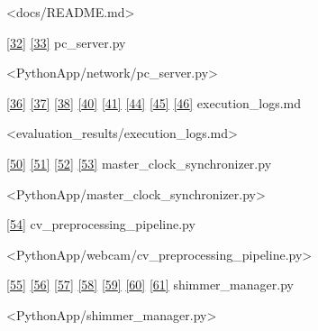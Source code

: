 \documentclass[12pt,a4paper]{article}
\begin{document}
\textless docs/README.md\textgreater{}

\href{PythonApp/network/pc_server.py\#L44-L53}{{[}32{]}} \href{PythonApp/network/pc_server.py\#L90-L98}{{[}33{]}} pc\_server.py

\textless PythonApp/network/pc\_server.py\textgreater{}

\href{evaluation_results/execution_logs.md\#L16-L24}{{[}36{]}} \href{evaluation_results/execution_logs.md\#L38-L46}{{[}37{]}} \href{evaluation_results/execution_logs.md\#L104-L113}{{[}38{]}} \href{evaluation_results/execution_logs.md\#L40-L48}{{[}40{]}} \href{evaluation_results/execution_logs.md\#L50-L58}{{[}41{]}} \href{evaluation_results/execution_logs.md\#L62-L70}{{[}44{]}} \href{evaluation_results/execution_logs.md\#L72-L75}{{[}45{]}} \href{evaluation_results/execution_logs.md\#L140-L146}{{[}46{]}} execution\_logs.md

\textless evaluation\_results/execution\_logs.md\textgreater{}

\href{PythonApp/master_clock_synchronizer.py\#L86-L94}{{[}50{]}} \href{PythonApp/master_clock_synchronizer.py\#L95-L102}{{[}51{]}} \href{PythonApp/master_clock_synchronizer.py\#L86-L102}{{[}52{]}} \href{PythonApp/master_clock_synchronizer.py\#L164-L172}{{[}53{]}} master\_clock\_synchronizer.py

\textless PythonApp/master\_clock\_synchronizer.py\textgreater{}

\href{PythonApp/webcam/cv_preprocessing_pipeline.py\#L72-L80}{{[}54{]}} cv\_preprocessing\_pipeline.py

\textless PythonApp/webcam/cv\_preprocessing\_pipeline.py\textgreater{}

\href{PythonApp/shimmer_manager.py\#L241-L249}{{[}55{]}} \href{PythonApp/shimmer_manager.py\#L250-L258}{{[}56{]}} \href{PythonApp/shimmer_manager.py\#L241-L258}{{[}57{]}} \href{PythonApp/shimmer_manager.py\#L134-L143}{{[}58{]}} \href{PythonApp/shimmer_manager.py\#L269-L278}{{[}59{]}} \href{PythonApp/shimmer_manager.py\#L280-L289}{{[}60{]}} \href{PythonApp/shimmer_manager.py\#L145-L151}{{[}61{]}} shimmer\_manager.py

\textless PythonApp/shimmer\_manager.py\textgreater{}

\newpage



\end{document}
